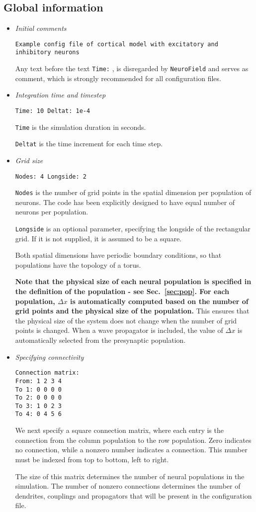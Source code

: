 \documentclass[12pt,a4paper]{article}
\newcommand{\type}[1]{ {\small\small\tt #1} }
\newcommand{\NF}[0]{ \type{NeuroField}}
\begin{document}
\subsection{Global information}
\label{sec:global}
\begin{itemize}

\item {\em Initial comments}
\begin{lstlisting}
Example config file of cortical model with excitatory and inhibitory neurons
\end{lstlisting}
Any text before the text \type{Time:}, is disregarded by \NF and serves as comment, which is strongly recommended for all configuration files.
\item  {\em Integration time and timestep}
\begin{lstlisting}
Time: 10 Deltat: 1e-4
\end{lstlisting}
\type{Time} is the simulation duration in seconds.

\type{Deltat} is the time increment for each time step.
\item  {\em Grid size}
\begin{lstlisting}
Nodes: 4 Longside: 2
\end{lstlisting}
\type{Nodes} is the number of grid points in the spatial dimension per population of neurons. The code has been explicitly designed to have equal number of neurons per population.

\type{Longside} is an optional parameter, specifying the longside of the rectangular grid. If it is not supplied, it is assumed to be a square.

Both spatial dimensions have periodic boundary conditions, so that populations have the topology of a torus.

{\bf Note that the physical size of each neural population is specified in the definition of the population - see Sec.~\ref{sec:pop}. For each population, $\Delta x$ is automatically computed based on the number of grid points and the physical size of the population.} This ensures that the physical size of the system does not change when the number of grid points is changed. When a wave propagator is included, the value of $\Delta x$ is automatically selected from the presynaptic population. 

\item {\em Specifying connectivity}
\begin{lstlisting}
Connection matrix:
From: 1 2 3 4
To 1: 0 0 0 0
To 2: 0 0 0 0
To 3: 1 0 2 3
To 4: 0 4 5 6
\end{lstlisting}
We next specify a square connection matrix, where each entry is the connection from the column population to the row population. Zero indicates no connection, while a nonzero number indicates a connection. This number must be indexed from top to bottom, left to right.

The size of this matrix determines the number of neural populations in the simulation. The number of nonzero connections determines the number of dendrites, couplings and propagators that will be present in the configuration file.
\end{itemize}
\end{document}
